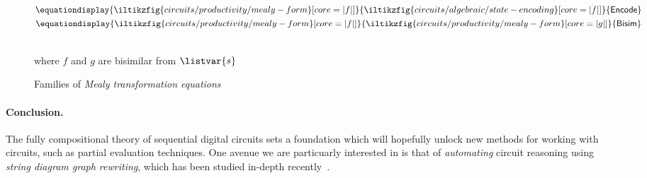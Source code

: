 \documentclass[10pt]{article}
\begin{document}
\begin{figure}
    \centering
    \(\equationdisplay{
        \iltikzfig{circuits/productivity/mealy-form}[core=|f|]
    }{
        \iltikzfig{circuits/algebraic/state-encoding}[core=|f|]
    }{\mathsf{Encode}}\)
    \qquad
    \(\equationdisplay{
        \iltikzfig{circuits/productivity/mealy-form}[core=|f|]
    }{
        \iltikzfig{circuits/productivity/mealy-form}[core=|g|]
    }{\mathsf{Bisim}}\)
    \,\,
    \begin{minipage}{0.15\textwidth}
        \centering
        where \(f\) and \(g\) are bisimilar from \(\listvar{s}\)
    \end{minipage}
    \caption{Families of \emph{Mealy transformation equations}}
    \label{fig:mealy-transformation-equations}
\end{figure}

\paragraph*{Conclusion.}

The fully compositional theory of sequential digital circuits sets a foundation
which will hopefully unlock new methods for working with circuits, such as
partial evaluation techniques.
One avenue we are particuarly interested in is that of \emph{automating}
circuit reasoning using \emph{string diagram graph rewriting}, which has been
studied in-depth recently~\cite{bonchi2022string,ghica2023rewriting}.

\printbibliography[heading=bibintoc,title={References}]
\end{document}
